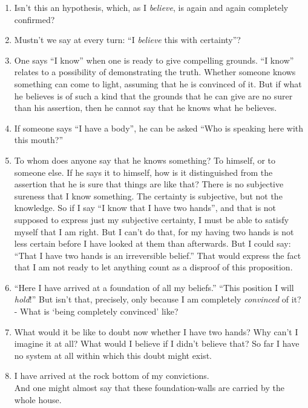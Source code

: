 \documentclass{book}
\begin{document}
\begin{enumerate}
\item
Isn't this an hypothesis, which, as I \emph{believe}, is again and again
completely confirmed?

\item
Mustn't we say at every turn: ``I \emph{believe} this with certainty''?

\item
One says ``I know'' when one is ready to give compelling grounds. ``I know''
relates to a possibility of demonstrating the truth. Whether someone knows
something can come to light, assuming that he is convinced of it.  But if what
he believes is of such a kind that the grounds that he can give are no surer
than his assertion, then he cannot say that he knows what he believes.

\item
If someone says ``I have a body'', he can be asked ``Who is speaking here with
this mouth?''

\item
To whom does anyone say that he knows something? To himself, or to someone
else. If he says it to himself, how is it distinguished from the assertion that
he is sure that things are like that? There is no subjective sureness that I
know something. The certainty is subjective, but not the knowledge. So if I say
``I know that I have two hands'', and that is not supposed to express just my
subjective certainty, I must be able to satisfy myself that I am right. But I
can't do that, for my having two hands is not less certain before I have looked
at them than afterwards. But I could say: ``That I have two hands is an
irreversible belief.'' That would express the fact that I am not ready to let
anything count as a disproof of this proposition.

\item
``Here I have arrived at a foundation of all my beliefs.'' ``This position I
will \emph{hold}!'' But isn't that, precisely, only because I am completely
\emph{convinced} of it? - What is `being completely convinced' like?

\item
What would it be like to doubt now whether I have two hands? Why can't I
imagine it at all? What would I believe if I didn't believe that? So far I have
no system at all within which this doubt might exist.

\item
I have arrived at the rock bottom of my convictions. \\
And one might almost say that these foundation-walls are carried by the whole
house.


\end{enumerate}
\end{document}
